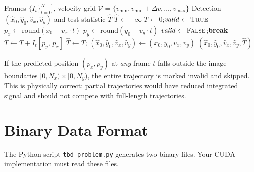 \documentclass[11pt,letterpaper]{article}
\begin{document}
\begin{algorithm}[H]
\caption{Brute-Force Shift-and-Stack TBD}
\label{alg:tbd}
\begin{algorithmic}[1]
\Require Frames $\{I_t\}_{t=0}^{N-1}$, velocity grid $\mathcal{V} = \{v_{\min}, v_{\min}+\Delta v, \ldots, v_{\max}\}$
\Ensure Detection $(\hat{x}_0, \hat{y}_0, \hat{v}_x, \hat{v}_y)$ and test statistic $\hat{T}$
\State $\hat{T} \gets -\infty$
                \State $T \gets 0$;\quad $\mathit{valid} \gets \textsc{True}$
                    \State $p_x \gets \mathrm{round}(x_0 + v_x \cdot t)$
                    \State $p_y \gets \mathrm{round}(y_0 + v_y \cdot t)$
                    \If{$p_x \notin [0, N_x)$ \textbf{or} $p_y \notin [0, N_y)$}
                        \State $\mathit{valid} \gets \textsc{False}$;\quad \textbf{break}
                    \EndIf
                    \State $T \gets T + I_t[p_y,\, p_x]$
                \EndFor
                    \State $\hat{T} \gets T$;\quad
                           $(\hat{x}_0, \hat{y}_0, \hat{v}_x, \hat{v}_y) \gets (x_0, y_0, v_x, v_y)$
                \EndIf
            \EndFor
        \EndFor
    \EndFor
\EndFor
\State \Return $(\hat{x}_0, \hat{y}_0, \hat{v}_x, \hat{v}_y, \hat{T})$
\end{algorithmic}
\end{algorithm}

\begin{notebox}
If the predicted position $(p_x, p_y)$ at \emph{any} frame $t$ falls
outside the image boundaries $[0, N_x) \times [0, N_y)$, the entire
trajectory is marked invalid and skipped. This is physically correct:
partial trajectories would have reduced integrated signal and should not
compete with full-length trajectories.
\end{notebox}

\section{Binary Data Format}
\label{sec:data_format}

The Python script \texttt{tbd\_problem.py} generates two binary files.
Your CUDA implementation must read these files.
\end{document}

